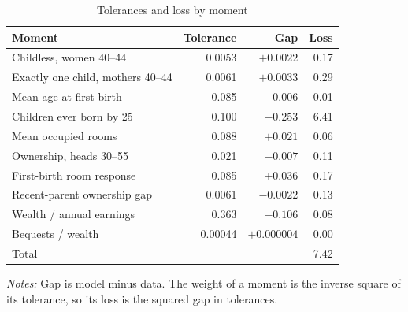 \begin{table}[ht]
\centering
\caption{Tolerances and loss by moment}
\label{tab:app-loss}
\small
\begin{tabularx}{0.8\textwidth}{@{}X r r r@{}}
\toprule
Moment & Tolerance & Gap & Loss \\
\midrule
Childless, women 40--44 & 0.0053 & $+0.0022$ & 0.17 \\
Exactly one child, mothers 40--44 & 0.0061 & $+0.0033$ & 0.29 \\
Mean age at first birth & 0.085 & $-0.006$ & 0.01 \\
Children ever born by 25 & 0.100 & $-0.253$ & 6.41 \\
Mean occupied rooms & 0.088 & $+0.021$ & 0.06 \\
Ownership, heads 30--55 & 0.021 & $-0.007$ & 0.11 \\
First-birth room response & 0.085 & $+0.036$ & 0.17 \\
Recent-parent ownership gap & 0.0061 & $-0.0022$ & 0.13 \\
Wealth / annual earnings & 0.363 & $-0.106$ & 0.08 \\
Bequests / wealth & 0.00044 & $+0.000004$ & 0.00 \\
\midrule
Total & & & 7.42 \\
\bottomrule
\end{tabularx}
\par\smallskip
\begin{minipage}{0.8\linewidth}
\footnotesize\textit{Notes:} Gap is model minus data. The weight of a
moment is the inverse square of its tolerance, so its loss is the squared
gap in tolerances. 
\end{minipage}
\end{table}

